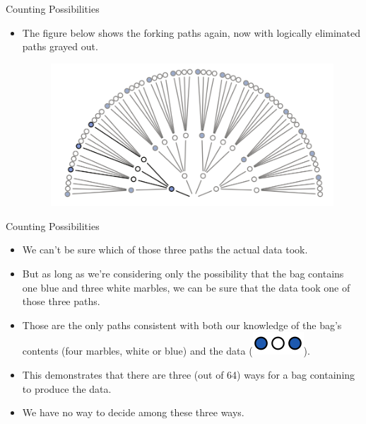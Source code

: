 \documentclass[handout]{beamer}
\begin{document}
\begin{frame}{Counting Possibilities}
\scriptsize{
\begin{itemize}
 \item The figure below shows the forking paths again, now with logically eliminated paths grayed out.

\begin{figure}[h!]
	\centering
	\includegraphics[scale=0.33]{pics/marbles9.png}
\end{figure}
\end{itemize}
 } 
\end{frame}



\begin{frame}{Counting Possibilities}
\scriptsize{
\begin{itemize}
\item We can't be sure which of those three paths the actual data took.
\item But as long as we're considering only the possibility that the bag contains one blue and three white marbles, we can be sure that the data took one of those three paths.

\item Those are the only paths consistent with both our knowledge of the bag's contents (four marbles, white or blue) and the data (\includegraphics[scale=0.3]{pics/marbles2.png}).  

 \item This demonstrates that there are three (out of 64) ways for a bag containing to produce the data.
 \item We have no way to decide among these three ways. 
\end{itemize}
 } 
\end{frame}
\end{document}
